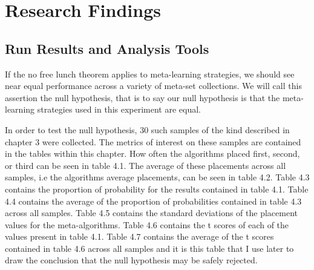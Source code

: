 \chapter{Research Findings}
\label{Chapter4}
\section{Run Results and Analysis Tools}
If the no free lunch theorem applies to  meta-learning strategies, we
should see near equal performance across a variety of meta-set collections.
We will call this assertion the null hypothesis, that is to say our null
hypothesis is that the meta-learning strategies used in this experiment
are equal.

In order to test the null hypothesis, 30 such samples of the kind described
in chapter 3 were collected. The metrics of interest on these samples are
contained in the tables within this chapter. How often the algorithms placed
first, second, or third can be seen in table 4.1. The average of these
placements across all samples, i.e the algorithms average placements, can be
seen in table 4.2. Table 4.3 contains the proportion of probability for the
results contained in table 4.1. Table 4.4 contains the average of the
proportion of probabilities contained in table 4.3 across all samples.
Table 4.5 contains the standard deviations of the placement values for the
meta-algorithms. Table 4.6 contains the t scores of each of the values present
in table 4.1. Table 4.7 contains the average of the t scores contained in
table 4.6 across all samples and it is this table that I use later to draw the
conclusion that the null hypothesis may be safely rejected.

